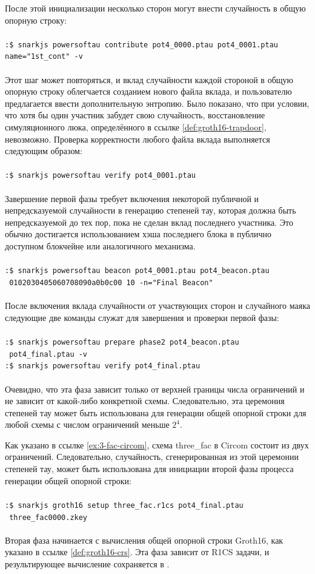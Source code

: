 \begin{example}
После этой инициализации несколько сторон могут внести случайность в общую опорную строку:
\\
\\
\texttt{:\$ snarkjs powersoftau contribute pot4\_0000.ptau pot4\_0001.ptau \-\-name="1st\_cont" -v}
\\
\\
Этот шаг может повторяться, и вклад случайности каждой стороной в общую опорную строку облегчается созданием нового файла вклада, и пользователю предлагается ввести дополнительную энтропию. Было показано, что при условии, что хотя бы один участник забудет свою случайность, восстановление симуляционного люка, определённого в ссылке \ref{def:groth16-trapdoor}, невозможно. Проверка корректности любого файла вклада выполняется следующим образом:
\\
\\
\texttt{:\$ snarkjs powersoftau verify pot4\_0001.ptau}
\\
\\
Завершение первой фазы требует включения некоторой публичной и непредсказуемой случайности в генерацию степеней тау, которая должна быть непредсказуемой до тех пор, пока не сделан вклад последнего участника. Это обычно достигается использованием хэша последнего блока в публично доступном блокчейне или аналогичного механизма.
\\
\\
\texttt{:\$ snarkjs powersoftau beacon pot4\_0001.ptau pot4\_beacon.ptau \ 0102030405060708090a0b0c00 10 -n="Final Beacon"}
\\
\\
После включения вклада случайности от участвующих сторон и случайного маяка следующие две команды служат для завершения и проверки первой фазы:
\\
\\
\texttt{:\$ snarkjs powersoftau prepare phase2 pot4\_beacon.ptau \ pot4\_final.ptau -v}\\
\texttt{:\$ snarkjs powersoftau verify pot4\_final.ptau}
\\
\\
Очевидно, что эта фаза зависит только от верхней границы числа ограничений и не зависит от какой-либо конкретной схемы. Следовательно, эта церемония степеней тау может быть использована для генерации общей опорной строки для любой схемы с числом ограничений меньше $2^4$.

Как указано в ссылке \ref{ex:3-fac-circom}, схема three\_fac в Circom состоит из двух ограничений. Следовательно, случайность, сгенерированная из этой церемонии степеней тау, может быть использована для инициации второй фазы процесса генерации общей опорной строки:
\\
\\
\texttt{:\$ snarkjs groth16 setup three\_fac.r1cs pot4\_final.ptau \ three\_fac0000.zkey}
\\
\\
Вторая фаза начинается с вычисления общей опорной строки Groth16, как указано в ссылке \ref{def:groth16-crs}. Эта фаза зависит от R1CS задачи, и результирующее вычисление сохраняется в .


\end{example}
